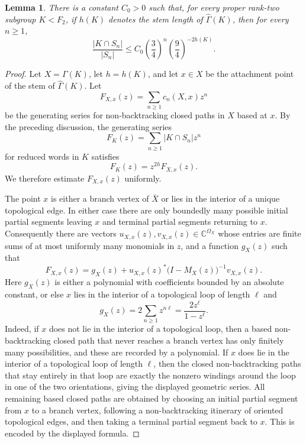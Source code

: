 \documentclass[10pt,a4paper]{amsart}
\newtheorem{lemma}{Lemma}
\begin{document}
\begin{lemma}\label{L.return}
There is a constant $C_0>0$ such that, for every proper rank-two subgroup
$K<F_2$, if $h(K)$ denotes the stem length of $\widehat\Gamma(K)$, then for
every $n\geq 1$,
\[
        \frac{|K\cap S_n|}{|S_n|}
        \leq C_0\left(\frac34\right)^n\left(\frac94\right)^{-2h(K)}.
\]
\end{lemma}

\begin{proof}
Let $X=\Gamma(K)$, let $h=h(K)$, and let $x\in X$ be the attachment point of
the stem of $\widehat\Gamma(K)$.  Let
\[
        F_{X,x}(z)=\sum_{n\geq 1} c_n(X,x)z^n
\]
be the generating series for non-backtracking closed paths in $X$ based at $x$.
By the preceding discussion, the generating series
\[
        F_K(z)=\sum_{n\geq 1}|K\cap S_n|z^n
\]
for reduced words in $K$ satisfies
\[
        F_K(z)=z^{2h}F_{X,x}(z).
\]
We therefore estimate $F_{X,x}(z)$ uniformly.

The point $x$ is either a branch vertex
of $\bar X$ or lies in the interior of a unique topological edge.  In
either case there are only boundedly many possible initial partial segments
leaving $x$ and terminal partial segments returning to $x$.  Consequently
there are vectors $u_{X,x}(z),v_{X,x}(z)\in \mathbb C^{\Omega_X}$ whose entries are
finite sums of at most uniformly many monomials in $z$, and a function $g_X(z)$
such that
\[
        F_{X,x}(z)=g_X(z)+u_{X,x}(z)^\ast\bigl(I-M_X(z)\bigr)^{-1}v_{X,x}(z).
\]
Here $g_X(z)$ is either a polynomial with coefficients bounded by an absolute
constant, or else $x$ lies in the interior of a topological loop of length
$\ell$ and
\[
        g_X(z)=2\sum_{n\geq 1} z^{n\ell}=\frac{2z^\ell}{1-z^\ell}.
\]
Indeed, if $x$ does not lie in the interior of a topological loop, then a
based non-backtracking closed path that never reaches a branch vertex has only
finitely many possibilities, and these are recorded by a polynomial.  If $x$
does lie in the interior of a topological loop of length $\ell$, then the closed
non-backtracking paths that stay entirely in that loop are exactly the nonzero
windings around the loop in one of the two orientations, giving the displayed
geometric series.  All remaining based closed paths are obtained by choosing an
initial partial segment from $x$ to a branch vertex, following a
non-backtracking itinerary of oriented topological edges, and then taking a
terminal partial segment back to $x$.  This is encoded by the displayed
formula.


\end{proof}
\end{document}
